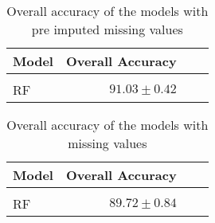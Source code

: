 \begin{table}[!htbp]
  \centering
    \begin{tabular}{lrrr}
    Model                       & Overall Accuracy             \\[0.2cm] 
    \hline \\[-0.2cm]
    RF      & $91.03 \pm 0.42$
    \end{tabular}
  \caption{Overall accuracy of the models with pre imputed missing values} 
\end{table}

\begin{table}[!htbp]
  \centering
    \begin{tabular}{lrrr}
    Model                       & Overall Accuracy             \\[0.2cm] 
    \hline \\[-0.2cm]
    RF  & $89.72 \pm 0.84$
    \end{tabular}
  \caption{Overall accuracy of the models with missing values} 
\end{table}
